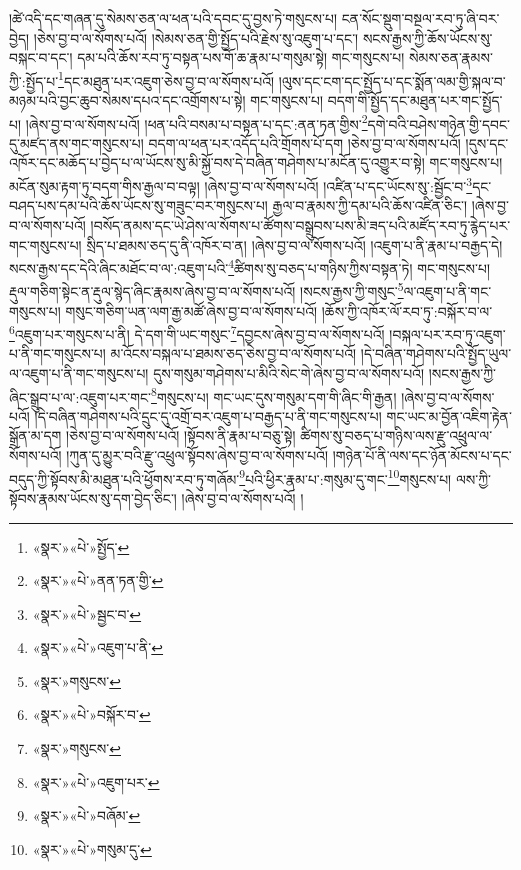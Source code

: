 །ཚེ་འདི་དང་གཞན་དུ་སེམས་ཅན་ལ་ཕན་པའི་དབང་དུ་བྱས་ཏེ་གསུངས་པ། ངན་སོང་སྡུག་བསྔལ་རབ་ཏུ་ཞི་བར་བྱེད། །ཅེས་བྱ་བ་ལ་སོགས་པའོ། །སེམས་ཅན་གྱི་སྤྱོད་པའི་རྗེས་སུ་འཇུག་པ་དང་། སངས་རྒྱས་ཀྱི་ཆོས་ཡོངས་སུ་བསྐང་བ་དང་། དམ་པའི་ཆོས་རབ་ཏུ་བསྟན་པས་གོ་ཆ་རྣམ་པ་གསུམ་སྟེ། གང་གསུངས་པ། སེམས་ཅན་རྣམས་ཀྱི་:སྤྱོད་པ་\footnote{«སྣར་»«པེ་»སྤྱོད་}དང་མཐུན་པར་འཇུག་ཅེས་བྱ་བ་ལ་སོགས་པའོ། །ལུས་དང་ངག་དང་སྤྱོད་པ་དང་སྨོན་ལམ་གྱི་སྐལ་བ་མཉམ་པའི་བྱང་ཆུབ་སེམས་དཔའ་དང་འགྲོགས་པ་སྟེ། གང་གསུངས་པ། བདག་གི་སྤྱོད་དང་མཐུན་པར་གང་སྤྱོད་པ། །ཞེས་བྱ་བ་ལ་སོགས་པའོ། །ཕན་པའི་བསམ་པ་བསྟན་པ་དང་:ནན་ཏན་གྱིས་\footnote{«སྣར་»«པེ་»ནན་ཏན་གྱི་}དགེ་བའི་བཤེས་གཉེན་གྱི་དབང་དུ་མཛད་ནས་གང་གསུངས་པ། བདག་ལ་ཕན་པར་འདོད་པའི་གྲོགས་པོ་དག །ཅེས་བྱ་བ་ལ་སོགས་པའོ། །དུས་དང་འཁོར་དང་མཆོད་པ་བྱེད་པ་ལ་ཡོངས་སུ་མི་སྐྱོ་བས་དེ་བཞིན་གཤེགས་པ་མངོན་དུ་འགྱུར་བ་སྟེ། གང་གསུངས་པ། མངོན་སུམ་རྟག་ཏུ་བདག་གིས་རྒྱལ་བ་བལྟ། །ཞེས་བྱ་བ་ལ་སོགས་པའོ། །འཛིན་པ་དང་ཡོངས་སུ་:སྦྱོང་བ་\footnote{«སྣར་»«པེ་»སྦྱང་བ་}དང་བཤད་པས་དམ་པའི་ཆོས་ཡོངས་སུ་གཟུང་བར་གསུངས་པ། རྒྱལ་བ་རྣམས་ཀྱི་དམ་པའི་ཆོས་འཛིན་ཅིང་། །ཞེས་བྱ་བ་ལ་སོགས་པའོ། །བསོད་ནམས་དང་ཡེ་ཤེས་ལ་སོགས་པ་ཚོགས་བསྒྲུབས་པས་མི་ཟད་པའི་མཛོད་རབ་ཏུ་རྙེད་པར་གང་གསུངས་པ། སྲིད་པ་ཐམས་ཅད་དུ་ནི་འཁོར་བ་ན། །ཞེས་བྱ་བ་ལ་སོགས་པའོ། །འཇུག་པ་ནི་རྣམ་པ་བརྒྱད་དེ། སངས་རྒྱས་དང་དེའི་ཞིང་མཐོང་བ་ལ་:འཇུག་པའི་\footnote{«སྣར་»«པེ་»འཇུག་པ་ནི་}ཚིགས་སུ་བཅད་པ་གཉིས་ཀྱིས་བསྟན་ཏེ། གང་གསུངས་པ། རྡུལ་གཅིག་སྟེང་ན་རྡུལ་སྙེད་ཞིང་རྣམས་ཞེས་བྱ་བ་ལ་སོགས་པའོ། །སངས་རྒྱས་ཀྱི་གསུང་\footnote{«སྣར་»གསུངས་}ལ་འཇུག་པ་ནི་གང་གསུངས་པ། གསུང་གཅིག་ཡན་ལག་རྒྱ་མཚོ་ཞེས་བྱ་བ་ལ་སོགས་པའོ། །ཆོས་ཀྱི་འཁོར་ལོ་རབ་ཏུ་:བསྐོར་བ་ལ་\footnote{«སྣར་»«པེ་»བསྐོར་བ་}འཇུག་པར་གསུངས་པ་ནི། དེ་དག་གི་ཡང་གསུང་\footnote{«སྣར་»གསུངས་}དབྱངས་ཞེས་བྱ་བ་ལ་སོགས་པའོ། །བསྐལ་པར་རབ་ཏུ་འཇུག་པ་ནི་གང་གསུངས་པ། མ་འོངས་བསྐལ་པ་ཐམས་ཅད་ཅེས་བྱ་བ་ལ་སོགས་པའོ། །དེ་བཞིན་གཤེགས་པའི་སྤྱོད་ཡུལ་ལ་འཇུག་པ་ནི་གང་གསུངས་པ། དུས་གསུམ་གཤེགས་པ་མིའི་སེང་གེ་ཞེས་བྱ་བ་ལ་སོགས་པའོ། །སངས་རྒྱས་ཀྱི་ཞིང་སྒྲུབ་པ་ལ་:འཇུག་པར་གང་\footnote{«སྣར་»«པེ་»འཇུག་པར་}གསུངས་པ། གང་ཡང་དུས་གསུམ་དག་གི་ཞིང་གི་རྒྱན། །ཞེས་བྱ་བ་ལ་སོགས་པའོ། །དེ་བཞིན་གཤེགས་པའི་དྲུང་དུ་འགྲོ་བར་འཇུག་པ་བརྒྱད་པ་ནི་གང་གསུངས་པ། གང་ཡང་མ་བྱོན་འཇིག་རྟེན་སྒྲོན་མ་དག །ཅེས་བྱ་བ་ལ་སོགས་པའོ། །སྟོབས་ནི་རྣམ་པ་བཅུ་སྟེ། ཚིགས་སུ་བཅད་པ་གཉིས་ལས་རྫུ་འཕྲུལ་ལ་སོགས་པའོ། །ཀུན་དུ་མྱུར་བའི་རྫུ་འཕྲུལ་སྟོབས་ཞེས་བྱ་བ་ལ་སོགས་པའོ། །གཉེན་པོ་ནི་ལས་དང་ཉོན་མོངས་པ་དང་བདུད་ཀྱི་སྟོབས་མི་མཐུན་པའི་ཕྱོགས་རབ་ཏུ་གཞོམ་\footnote{«སྣར་»«པེ་»བཞོམ་}པའི་ཕྱིར་རྣམ་པ་:གསུམ་དུ་གང་\footnote{«སྣར་»«པེ་»གསུམ་དུ་}གསུངས་པ། ལས་ཀྱི་སྟོབས་རྣམས་ཡོངས་སུ་དག་བྱེད་ཅིང་། །ཞེས་བྱ་བ་ལ་སོགས་པའོ། །
